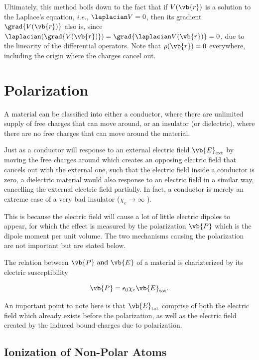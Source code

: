 \documentclass[english,a4paper,12pt]{report}
\begin{document}
Ultimately, this method boils down to the fact that if \(V (\vb{r} )\) is a solution to the Laplace's equation, \textit{i.e.,} \(\laplacian V = 0\), then its gradient \(\grad{V(\vb{r} )} \) also is, since \(\laplacian (\grad{V(\vb{r} )} ) = \grad{\laplacian V(\vb{r} )} = 0 \), due to the linearity of the differential operators. Note that \(\rho (\vb{r} ) = 0\) everywhere, including the origin where the charges cancel out.








\section{Polarization}

A material can be classified into either a conductor, where there are unlimited supply of free charges that can move around, or an insulator (or dielectric), where there are no free charges that can move around the material. 

Just as a conductor will response to an external electric field \(\vb{E} _{\text{ext} } \)  by moving the free charges around which creates an opposing electric field that cancels out with the external one, such that the electric field inside a conductor is zero, a dielectric material would also response to an electric field in a similar way, cancelling the external electric field partially. In fact, a conductor is merely an extreme case of a very bad insulator (\(\chi _{e} \to \infty\) ).

This is because the electric field will cause a lot of little electric dipoles to appear, for which the effect is measured by the polarization \(\vb{P} \) which is the dipole moment per unit volume. The two mechanisms causing the polarization are not important but are stated below.

The relation between \(\vb{P} \text { and } \vb{E} \) of a material is charizterized by its electric susceptibility 

\begin{equation}
    \vb{P} = \epsilon _{0} \chi _{e}\vb{E}_{\text{tot} }.
\end{equation}

An important point to note here is that \(\vb{E} _{\text{tot} } \) comprise of both the electric field which already exists before the polarization, as well as the electric field created by the induced bound charges due to polarization. 

\subsection{Ionization of Non-Polar Atoms}
\end{document}
